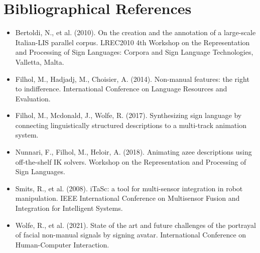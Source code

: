 \documentclass[../../main.tex]{subfiles}
\begin{document}
\section{Bibliographical References}
\begin{itemize}
    \item Bertoldi, N., et al. (2010). On the creation and the annotation of a large-scale Italian-LIS parallel corpus. LREC2010 4th Workshop on the Representation and Processing of Sign Languages: Corpora and Sign Language Technologies, Valletta, Malta.
    \item Filhol, M., Hadjadj, M., Choisier, A. (2014). Non-manual features: the right to indifference. International Conference on Language Resources and Evaluation.
    \item Filhol, M., Mcdonald, J., Wolfe, R. (2017). Synthesizing sign language by connecting linguistically structured descriptions to a multi-track animation system.
    \item Nunnari, F., Filhol, M., Heloir, A. (2018). Animating azee descriptions using off-the-shelf IK solvers. Workshop on the Representation and Processing of Sign Languages.
    \item Smits, R., et al. (2008). iTaSc: a tool for multi-sensor integration in robot manipulation. IEEE International Conference on Multisensor Fusion and Integration for Intelligent Systems.
    \item Wolfe, R., et al. (2021). State of the art and future challenges of the portrayal of facial non-manual signals by signing avatar. International Conference on Human-Computer Interaction.
\end{itemize}
\end{document}
